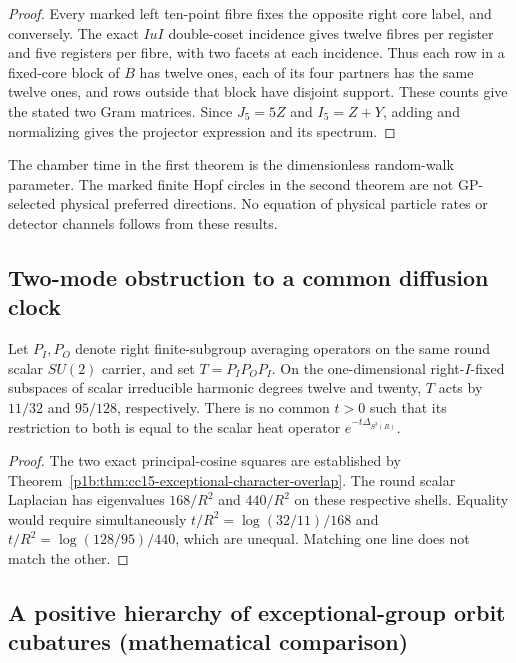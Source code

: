 \documentclass[11pt]{article}
\begin{document}
\begin{proof}
Every marked left ten-point fibre fixes the opposite right core label,
and conversely.  The exact $IuI$ double-coset incidence gives twelve
fibres per register and five registers per fibre, with two facets at
each incidence. Thus each row in a fixed-core block of $B$ has twelve
ones, each of its four partners has the same twelve ones, and rows
outside that block have disjoint support.  These counts give the
stated two Gram matrices.  Since $J_5=5Z$ and $I_5=Z+Y$, adding and
normalizing gives the projector expression and its spectrum.
\end{proof}
\begin{remark}
The chamber time in the first theorem is the dimensionless random-walk
parameter.  The marked finite Hopf circles in the second theorem are
not GP-selected physical preferred directions.  No equation of
physical particle rates or detector channels follows from these results.
\end{remark}


\subsection{Two-mode obstruction to a common diffusion clock}
\begin{proposition}
\label{cc19:prop:two-mode-no-heat-clock}
Let $P_I,P_O$ denote right finite-subgroup averaging operators on the
same round scalar $SU(2)$ carrier, and set $T=P_IP_OP_I$.
On the one-dimensional right-$I$-fixed subspaces of scalar irreducible
harmonic degrees twelve and twenty, $T$ acts by $11/32$ and $95/128$,
respectively. There is no common $t>0$ such that its restriction to
both is equal to the scalar heat operator $e^{-t\Delta_{S^3(R)}}$.
\end{proposition}
\begin{proof}
The two exact principal-cosine squares are established by
Theorem~\ref{p1b:thm:cc15-exceptional-character-overlap}.  The round
scalar Laplacian has eigenvalues $168/R^2$ and $440/R^2$ on these
respective shells. Equality would require simultaneously
$t/R^2=\log(32/11)/168$ and $t/R^2=\log(128/95)/440$,
which are unequal. Matching one line does not match the other.
\end{proof}



\subsection{A positive hierarchy of exceptional-group orbit cubatures (mathematical comparison)}
\label{p1b:sec:cc110-exceptional-orbit-ladder}
\end{document}
